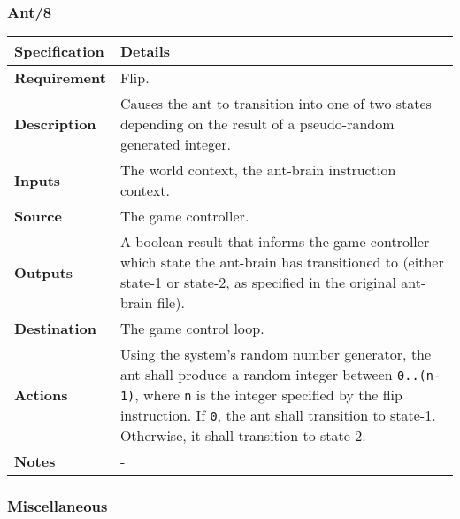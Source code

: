 \documentclass[11pt]{article}
\begin{document}
\subsubsection*{Ant/8}\label{ant8}

\begin{longtable}[c]{@{\extracolsep{\fill}}|p{}|p{}|@{}}
\hline
Specification & Details\tabularnewline
\hline

\textbf{Requirement} & Flip.\tabularnewline
\textbf{Description} & Causes the ant to transition into one of two
states depending on the result of a pseudo-random generated
integer.\tabularnewline
\textbf{Inputs} & The world context, the ant-brain instruction
context.\tabularnewline
\textbf{Source} & The game controller.\tabularnewline
\textbf{Outputs} & A boolean result that informs the game controller
which state the ant-brain has transitioned to (either state-1 or
state-2, as specified in the original ant-brain file).\tabularnewline
\textbf{Destination} & The game control loop.\tabularnewline
\textbf{Actions} & Using the system's random number generator, the ant
shall produce a random integer between \texttt{0..(n-1)}, where
\texttt{n} is the integer specified by the flip instruction. If
\texttt{0}, the ant shall transition to state-1. Otherwise, it shall
transition to state-2.\tabularnewline
\textbf{Notes} & -\tabularnewline
\hline
\end{longtable}

\subsubsection*{Miscellaneous}\label{miscellaneous-1}
\end{document}
